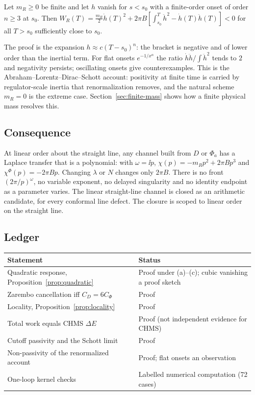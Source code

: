 \begin{proposition}
\label{prop:schott}
Let $m_R\ge0$ be finite and let $h$ vanish for $s<s_0$ with a finite-order onset of order $n\ge3$ at $s_0$.
Then $W_R(T)=\frac{m_R}2\dot h(T)^2+2\pi B[\int_{s_0}^T\ddot h^2-\dot h(T)\ddot h(T)]<0$ for all $T>s_0$
sufficiently close to $s_0$.
\end{proposition}

The proof is the expansion $h\approx c(T-s_0)^n$: the bracket is negative and of lower order than the inertial
term. For flat onsets $e^{-1/x^\alpha}$ the ratio $\dot h\ddot h/\int\ddot h^2$ tends to $2$ and negativity
persists; oscillating onsets give counterexamples. This is the Abraham--Lorentz--Dirac--Schott account:
positivity at finite time is carried by regulator-scale inertia that renormalization removes, and the
natural scheme $m_R=0$ is the extreme case. Section~\ref{sec:finite-mass} shows how a finite physical mass
resolves this.

\subsection{Consequence}

At linear order about the straight line, any channel built from $D$ or $\Phi_a$ has a Laplace transfer that
is a polynomial: with $\omega=\ii p$, $\chi(p)=-m_Rp^2+2\pi Bp^3$ and $\chi^\Phi(p)=-2\pi Bp$. Changing
$\lambda$ or $N$ changes only $2\pi B$. There is no front $(2\pi/p)^\omega$, no variable exponent, no delayed
singularity and no identity endpoint as a parameter varies. The linear straight-line channel is closed as an
arithmetic candidate, for every conformal line defect. The closure is scoped to linear order on the
straight line.

\subsection*{Ledger}
\begin{center}\small
\begin{tabular}{@{}p{}p{}@{}}
\toprule
Statement & Status\\
\midrule
Quadratic response, Proposition~\ref{prop:quadratic} & Proof under (a)--(c); cubic vanishing a proof sketch\\
Zarembo cancellation iff $C_D=6C_\Phi$ & Proof\\
Locality, Proposition~\ref{prop:locality} & Proof\\
Total work equals CHMS $\Delta E$ & Proof (not independent evidence for CHMS)\\
Cutoff passivity and the Schott limit & Proof\\
Non-passivity of the renormalized account & Proof; flat onsets an observation\\
One-loop kernel checks & Labelled numerical computation (72 cases)\\
\bottomrule
\end{tabular}
\end{center}
